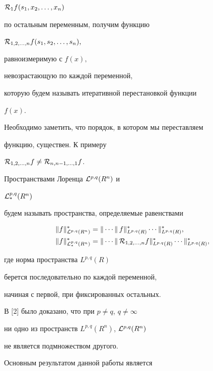 ${\cal R}_{1}f(s_1,x_2,\dotsc,x_n)$


по остальным переменным, получим функцию


${\cal R}_{1,2,\dotsc,n}f(s_1,s_2,\dotsc,s_n),$


равноизмеримую с $f(x),$


невозрастающую по каждой переменной,


которую будем называть итеративной перестановкой функции


$f(x)$.


Необходимо заметить, что порядок, в котором мы переставляем


функцию, существен. К примеру


${\cal R}_{1,2,\dotsc,n}f\ne {\cal R}_{n,n-1,\dotsc,1}f$.


Пространствами Лоренца ${\cal L}^{p,q}(R^n)$ и


${\cal L}_*^{p,q}(R^n)$


будем называть пространства, определяемые равенствами


\begin{align*}


\|f\|_{{\cal L}^{p,q}(R^n)}^* &=


\|\dotsb\|\, f \|_{L^{p,q}(R)}^* \dotsb


\|_{L^{p,q}(R)}^*,\\


\|f\|_{{\cal L}_*^{p,q}(R^n)}^* &=


\|\dotsb \|\,{\cal R}_{1,2,\dotsc,n}f\|_{L^{p,q}(R)}^*\dotsb


\|_{L^{p,q}(R)}^*,


\end{align*}


где норма пространства $L^{p,q}(R)$


берется последовательно по каждой переменной,


начиная с первой, при фиксированных остальных.





В [2] было доказано, что при $p\ne q$, $q \ne \infty$


ни одно из пространств $L^{p,q}(R^n)$, ${\cal L}^{p,q}(R^n)$


не является подмножеством другого.


Основным результатом данной работы является





